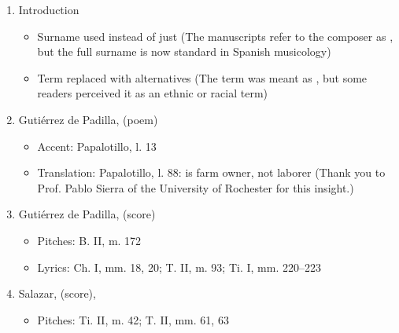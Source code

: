\begin{enumerate}
    \item Introduction
        \begin{itemize}
            \item Surname  used instead of just
                 (The manuscripts refer to the composer
                as , but the full surname is now
                standard in Spanish musicology)
            \item Term  replaced with alternatives (The
                term was meant as , but some
                readers perceived it as an ethnic or racial term)
        \end{itemize}
    \item  Gutiérrez de Padilla,  (poem)
        \begin{itemize}
            \item Accent: Papalotillo, l. 13
            \item Translation: Papalotillo, l. 88:  is farm
                owner, not laborer (Thank you to Prof. Pablo Sierra of the
                University of Rochester for this insight.)
        \end{itemize}
    \item Gutiérrez de Padilla,  (score)
        \begin{itemize}
            \item Pitches: B. II, m. 172
            \item Lyrics: Ch. I, mm. 18, 20; T. II, m. 93; Ti. I, mm. 220--223
        \end{itemize}
    \item Salazar,  (score), 
        \begin{itemize}
            \item Pitches: Ti. II, m. 42; T. II, mm. 61, 63 
        \end{itemize}
\end{enumerate}
\endinput
